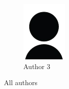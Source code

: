 \begin{figure}
\begin{subfigure}[b]{0.2\textwidth}
        \includegraphics[width=\textwidth]{figs/cv/author}
        \caption{Author 3}
        \label{fig:c1:auth3}
    \end{subfigure}
       \caption{All authors}
       \label{fig:c1:allauthors}
\end{figure}
